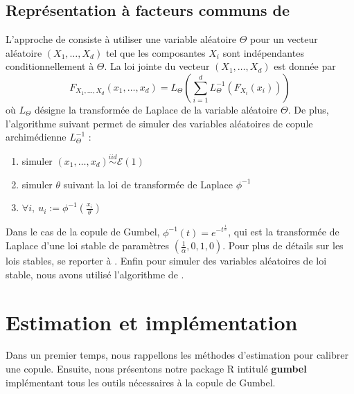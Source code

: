 \documentclass[11pt,a4paper]{article}
\newcommand{\pkg}{\textbf}
\newcommand{\soft}{\textsf}
\begin{document}
\subsection[Repr\'esentation \`a facteurs communs]{Repr\'esentation \`a facteurs communs de \cite{marshall}}
L'approche de \cite{marshall} consiste \`a utiliser une variable al\'eatoire $\Theta$ pour un vecteur al\'eatoire $(X_1, \dots, X_d)$ tel que les composantes $X_i$ sont ind\'ependantes conditionnellement \`a $\Theta$. La loi jointe du vecteur $(X_1, \dots, X_d)$ est donn\'ee par
$$
F_{X_1, \dots, X_d}(x_1, \dots, x_d)=L_\Theta\left( \sum_{i=1}^d L^{-1}_\Theta\left(F_{X_i}(x_i)\right) \right)
$$
o\`u $L_\Theta$ d\'esigne la transform\'ee de Laplace de la variable al\'eatoire $\Theta$. De plus, l'algorithme suivant permet de simuler des variables al\'eatoires de copule archim\'edienne $L^{-1}_\Theta$ :
\begin{enumerate}
\item simuler $(x_1,\dots,x_d)\stackrel{iid}{\sim} \mathcal E(1)$
\item simuler $\theta$ suivant la loi de transform\'ee de Laplace $\phi^{-1}$
\item $\forall i,~ u_i := \phi^{-1}\left(\frac{x_i}{\theta}\right)$
\end{enumerate}
Dans le cas de la copule de Gumbel, $\phi^{-1}(t)=e^{-t^{\frac{1}{\alpha}}}$, qui est la transform\'ee de Laplace d'une loi stable de param\`etres $(\frac{1}{\alpha},0,1,0)$. Pour plus de d\'etails sur les lois stables, se reporter \`a \cite{nolan}. Enfin pour simuler des variables al\'eatoires de loi stable, nous avons utilis\'e l'algorithme de \cite{chambers}.

% 
% 
% 

\section{Estimation et impl\'ementation}
Dans un premier temps, nous rappellons les m\'ethodes d'estimation pour calibrer une copule.
Ensuite, nous pr\'esentons notre package \soft{R} intitul\'e \pkg{gumbel} impl\'ementant tous les outils
n\'ecessaires \`a la copule de Gumbel.
\end{document}
